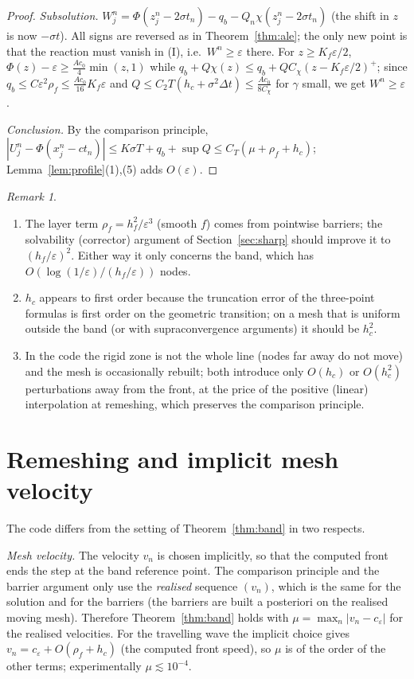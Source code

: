 \documentclass[11pt]{amsart}
\theoremstyle{remark}
\newtheorem{remark}[theorem]{Remark}
\newcommand{\ve}{\varepsilon}
\begin{document}
\begin{proof}
\emph{Subsolution.} $W^n_j=\Phi(z^n_j-2\sigma t_n)-q_b-Q_n\chi(z^n_j-2\sigma t_n)$ (the
shift in $z$ is now $-\sigma t$). All signs are reversed as in
Theorem~\ref{thm:ale}; the only new point is that the reaction must vanish in
(I), i.e.\ $W^n\ge\ve$ there. For $z\ge K_f\ve/2$,
$\Phi(z)-\ve\ge\frac{Ac_0}{4}\min(z,1)$ while
$q_b+Q\chi(z)\le q_b+QC_\chi(z-K_f\ve/2)^+$; since $q_b\le C\ve^2\rho_f\le\frac{Ac_0}{16}K_f\ve$
and $Q\le C_2T(h_c+\sigma^2\Delta t)\le\frac{Ac_0}{8C_\chi}$ for $\gamma$ small, we get $W^n\ge\ve$.

\emph{Conclusion.} By the comparison principle,
$|U^n_j-\Phi(x^n_j-ct_n)|\le K\sigma T+q_b+\sup Q\le C_T(\mu+\rho_f+h_c)$; Lemma~\ref{lem:profile}(1),(5)
adds $O(\ve)$.
\end{proof}

\begin{remark}
\begin{enumerate}
\item The layer term $\rho_f=h_f^2/\ve^3$ (smooth $f$) comes from pointwise
barriers; the solvability (corrector) argument of Section~\ref{sec:sharp}
should improve it to $(h_f/\ve)^2$. Either way it only concerns the band,
which has $O(\log(1/\ve)/(h_f/\ve))$ nodes.
\item $h_c$ appears to first order because the truncation error of the
three-point formulas is first order on the geometric transition; on a mesh that
is uniform outside the band (or with supraconvergence arguments) it should be
$h_c^2$.
\item In the code the rigid zone is not the whole line (nodes far away do not
move) and the mesh is occasionally rebuilt; both introduce only $O(h_c)$ or
$O(h_c^2)$ perturbations away from the front, at the price of the positive
(linear) interpolation at remeshing, which preserves the comparison principle.
\end{enumerate}
\end{remark}


\section{Remeshing and implicit mesh velocity}\label{sec:impl}

The code differs from the setting of Theorem~\ref{thm:band} in two respects.

\emph{Mesh velocity.} The velocity $v_n$ is chosen implicitly, so that the
computed front ends the step at the band reference point. The comparison
principle and the barrier argument only use the \emph{realised} sequence
$(v_n)$, which is the same for the solution and for the barriers (the
barriers are built a posteriori on the realised moving mesh). Therefore
Theorem~\ref{thm:band} holds with $\mu=\max_n|v_n-c_\ve|$ for the realised
velocities. For the travelling wave the implicit choice gives
$v_n=c_\ve+O(\rho_f+h_c)$ (the computed front speed), so $\mu$ is of the order
of the other terms; experimentally $\mu\lesssim10^{-4}$.
\end{document}
